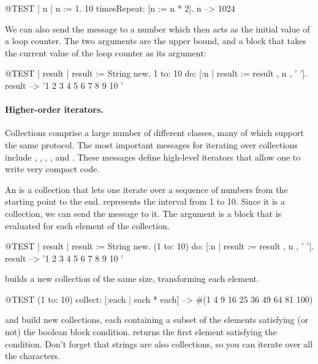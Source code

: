 \documentclass[a4paper,10pt,twoside]{book}
\begin{document}
\begin{code}{@TEST | n |}
n := 1.
10 timesRepeat: [n := n * 2].
n --> 1024
\end{code}

We can also send the message  to a number which then acts as the initial value of a loop counter.
The two arguments are the upper bound, and a block that takes the current value of the loop counter as its argument:

\begin{code}{@TEST | result |}
result := String new.
1 to: 10 do: [:n | result := result , n , ' '].
result --> '1 2 3 4 5 6 7 8 9 10 '
\end{code}

\paragraph{Higher-order iterators.}
Collections comprise a large number of different classes, many of which support the same protocol.
The most important messages for iterating over collections include
, , , ,  and .
These messages define high-level iterators that allow one to write very compact code.

An  is a collection that lets one iterate over a sequence of numbers from the starting point to the end.
 represents the interval from 1 to 10.
Since it is a collection, we can send the message  to it.
The argument is a block that is evaluated for each element of the collection.

\begin{code}{@TEST | result |}
result := String new.
(1 to: 10) do: [:n | result := result , n , ' '].
result --> '1 2 3 4 5 6 7 8 9 10 '
\end{code}

 builds a new collection of the same size, transforming each element.
\begin{code}{@TEST}
(1 to: 10) collect: [:each | each * each] --> #(1 4 9 16 25 36 49 64 81 100)
\end{code}

 and  build new collections, each containing a subset of the elements satisfying (or not) the boolean block condition.
 returns the first element satisfying the condition.
Don't forget that strings are also collections, so you can iterate over all the characters.
\end{document}

